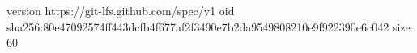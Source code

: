 version https://git-lfs.github.com/spec/v1
oid sha256:80e47092574ff443dcfb4f677af2f3490e7b2da9549808210e9f922390e6c042
size 60
